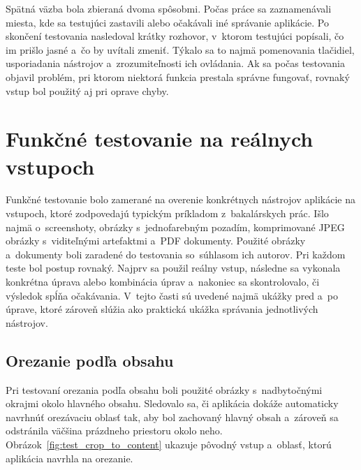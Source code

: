 Spätná väzba bola zbieraná dvoma spôsobmi. Počas práce sa zaznamenávali miesta, kde sa testujúci zastavili alebo očakávali iné správanie aplikácie. Po skončení testovania nasledoval krátky rozhovor, v~ktorom testujúci popísali, čo im prišlo jasné a~čo by uvítali zmeniť. Týkalo sa to najmä pomenovania tlačidiel, usporiadania nástrojov a~zrozumiteľnosti ich ovládania. Ak sa počas testovania objavil problém, pri ktorom niektorá funkcia prestala správne fungovať, rovnaký vstup bol použitý aj pri oprave chyby.

\section{Funkčné testovanie na reálnych vstupoch}
\label{sec:functional_testing}

Funkčné testovanie bolo zamerané na overenie konkrétnych nástrojov aplikácie na vstupoch, ktoré zodpovedajú typickým príkladom z~bakalárskych prác. Išlo najmä o~screenshoty, obrázky s~jednofarebným pozadím, komprimované JPEG obrázky s~viditeľnými artefaktmi a~PDF dokumenty. Použité obrázky a~dokumenty boli zaradené do testovania so~súhlasom ich autorov. Pri každom teste bol postup rovnaký. Najprv sa použil reálny vstup, následne sa vykonala konkrétna úprava alebo kombinácia úprav a~nakoniec sa skontrolovalo, či výsledok spĺňa očakávania. V~tejto časti sú uvedené najmä ukážky pred a~po úprave, ktoré zároveň slúžia ako praktická ukážka správania jednotlivých nástrojov.

\subsection{Orezanie podľa obsahu}
\label{subsec:test_crop}

Pri testovaní orezania podľa obsahu boli použité obrázky s~nadbytočnými okrajmi okolo hlavného obsahu. Sledovalo sa, či aplikácia dokáže automaticky navrhnúť orezávaciu oblasť tak, aby bol zachovaný hlavný obsah a~zároveň sa odstránila väčšina prázdneho priestoru okolo neho. Obrázok~\ref{fig:test_crop_to_content} ukazuje pôvodný vstup a~oblasť, ktorú aplikácia navrhla na orezanie.


